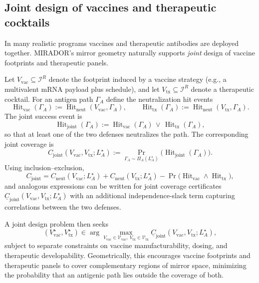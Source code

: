 \documentclass[11pt]{article}
\newcommand{\Hit}{\operatorname{Hit}}
\begin{document}
\subsection{Joint design of vaccines and therapeutic cocktails}
\label{subsec:joint-design}

In many realistic programs vaccines and therapeutic antibodies are deployed together. MIRADOR’s
mirror geometry naturally supports \emph{joint} design of vaccine footprints and therapeutic panels.

Let $V_{\mathrm{vac}} \subseteq \mathcal{I}^R$ denote the footprint induced by a vaccine strategy
(e.g., a multivalent mRNA payload plus schedule), and let
$V_{\mathrm{tx}} \subseteq \mathcal{I}^R$ denote a therapeutic cocktail. For an antigen path
$\Gamma_A$ define the neutralization hit events
\[
  \Hit_{\mathrm{vac}}(\Gamma_A) := \Hit_{\mathrm{neut}}(V_{\mathrm{vac}},\Gamma_A),
  \qquad
  \Hit_{\mathrm{tx}}(\Gamma_A)  := \Hit_{\mathrm{neut}}(V_{\mathrm{tx}},\Gamma_A).
\]
The joint success event is
\[
  \Hit_{\mathrm{joint}}(\Gamma_A)
  := \Hit_{\mathrm{vac}}(\Gamma_A) \,\vee\, \Hit_{\mathrm{tx}}(\Gamma_A),
\]
so that at least one of the two defenses neutralizes the path. The corresponding joint coverage is
\begin{equation}
  C_{\mathrm{joint}}(V_{\mathrm{vac}},V_{\mathrm{tx}};L_A^\star)
  := \Pr_{\Gamma_A \sim \Pi_A(L_A^\star)}
       \bigl( \Hit_{\mathrm{joint}}(\Gamma_A) \bigr).
\end{equation}
Using inclusion–exclusion,
\[
  C_{\mathrm{joint}}
  = C_{\mathrm{neut}}(V_{\mathrm{vac}};L_A^\star)
    + C_{\mathrm{neut}}(V_{\mathrm{tx}};L_A^\star)
    - \Pr\bigl( \Hit_{\mathrm{vac}} \wedge \Hit_{\mathrm{tx}} \bigr),
\]
and analogous expressions can be written for joint coverage certificates
$\underline{C}_{\mathrm{joint}}(V_{\mathrm{vac}},V_{\mathrm{tx}};L_A^\star)$ with an additional
independence-slack term capturing correlations between the two defenses.

A joint design problem then seeks
\begin{equation}
\label{eq:joint-design}
  (V_{\mathrm{vac}}^\star,V_{\mathrm{tx}}^\star)
  \in \arg\max_{V_{\mathrm{vac}} \in \mathcal{V}_{\mathrm{vac}},
               \, V_{\mathrm{tx}} \in \mathcal{V}_{\mathrm{tx}}}
      \underline{C}_{\mathrm{joint}}(V_{\mathrm{vac}},V_{\mathrm{tx}};L_A^\star),
\end{equation}
subject to separate constraints on vaccine manufacturability, dosing, and therapeutic
developability. Geometrically, this encourages vaccine footprints and therapeutic panels to cover
complementary regions of mirror space, minimizing the probability that an antigenic path lies
outside the coverage of both.
\end{document}
